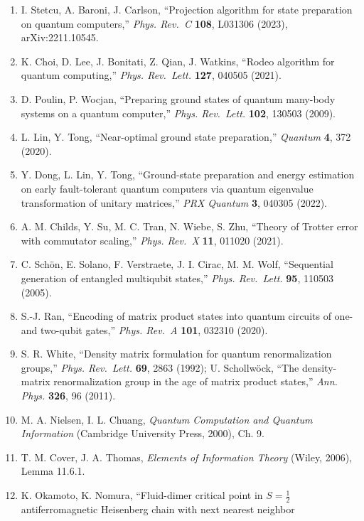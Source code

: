 \documentclass[
]{article}
\providecommand{\tightlist}{%
  \setlength{\itemsep}{0pt}\setlength{\parskip}{0pt}}
\begin{document}
\begin{enumerate}
\def\labelenumi{\arabic{enumi}.}
\tightlist
\item
  I. Stetcu, A. Baroni, J. Carlson, ``Projection algorithm for state
  preparation on quantum computers,'' \emph{Phys. Rev.~C} \textbf{108},
  L031306 (2023), arXiv:2211.10545.
\item
  K. Choi, D. Lee, J. Bonitati, Z. Qian, J. Watkins, ``Rodeo algorithm
  for quantum computing,'' \emph{Phys. Rev.~Lett.} \textbf{127}, 040505
  (2021).
\item
  D. Poulin, P. Wocjan, ``Preparing ground states of quantum many-body
  systems on a quantum computer,'' \emph{Phys. Rev.~Lett.} \textbf{102},
  130503 (2009).
\item
  L. Lin, Y. Tong, ``Near-optimal ground state preparation,''
  \emph{Quantum} \textbf{4}, 372 (2020).
\item
  Y. Dong, L. Lin, Y. Tong, ``Ground-state preparation and energy
  estimation on early fault-tolerant quantum computers via quantum
  eigenvalue transformation of unitary matrices,'' \emph{PRX Quantum}
  \textbf{3}, 040305 (2022).
\item
  A. M. Childs, Y. Su, M. C. Tran, N. Wiebe, S. Zhu, ``Theory of Trotter
  error with commutator scaling,'' \emph{Phys. Rev.~X} \textbf{11},
  011020 (2021).
\item
  C. Schön, E. Solano, F. Verstraete, J. I. Cirac, M. M. Wolf,
  ``Sequential generation of entangled multiqubit states,'' \emph{Phys.
  Rev.~Lett.} \textbf{95}, 110503 (2005).
\item
  S.-J. Ran, ``Encoding of matrix product states into quantum circuits
  of one- and two-qubit gates,'' \emph{Phys. Rev.~A} \textbf{101},
  032310 (2020).
\item
  S. R. White, ``Density matrix formulation for quantum renormalization
  groups,'' \emph{Phys. Rev.~Lett.} \textbf{69}, 2863 (1992); U.
  Schollwöck, ``The density-matrix renormalization group in the age of
  matrix product states,'' \emph{Ann. Phys.} \textbf{326}, 96 (2011).
\item
  M. A. Nielsen, I. L. Chuang, \emph{Quantum Computation and Quantum
  Information} (Cambridge University Press, 2000), Ch. 9.
\item
  T. M. Cover, J. A. Thomas, \emph{Elements of Information Theory}
  (Wiley, 2006), Lemma 11.6.1.
\item
  K. Okamoto, K. Nomura, ``Fluid-dimer critical point in \(S=\tfrac12\)
  antiferromagnetic Heisenberg chain with next nearest neighbor

\end{enumerate}
\end{document}
